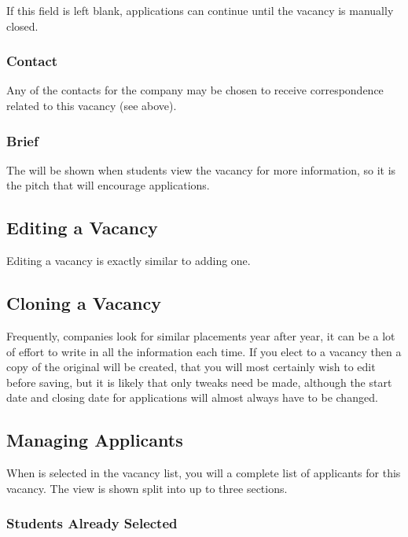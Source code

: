 \documentclass[12 pt]{book}
\begin{document}
If this field is left blank, applications can continue until the vacancy is
manually closed.

\subsubsection{Contact}

Any of the contacts for the company may be chosen to receive correspondence
related to this vacancy (see above).

\subsubsection{Brief}

The  will be shown when students view the vacancy for more
information, so it is the pitch that will encourage applications.

\subsection{Editing a Vacancy}

Editing a vacancy is exactly similar to adding one.

\subsection{Cloning a Vacancy}

Frequently, companies look for similar placements year after year, it can be
a lot of effort to write in all the information each time. If you elect to
 a vacancy then a copy of the original will be created, that
you will most certainly wish to edit before saving, but it is likely that
only tweaks need be made, although the start date and closing date for 
applications will almost always have to be changed.

\subsection{Managing Applicants}

When  is selected in the vacancy list, you will a 
complete list of applicants for this vacancy. The view is shown split into
up to three sections.

\subsubsection{Students Already Selected}
\end{document}
